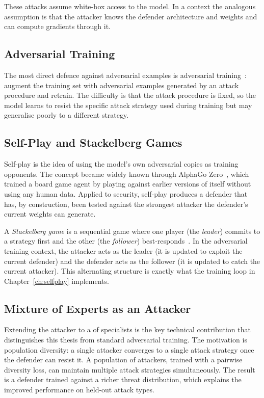 These attacks assume white-box access to the model. In a \wdn{}
context the analogous assumption is that the attacker knows the
defender architecture and weights and can compute gradients through
it.

\subsection{Adversarial Training}

The most direct defence against adversarial examples is adversarial
training~\cite{madry2018pgd}: augment the training set with adversarial
examples generated by an attack procedure and retrain. The difficulty
is that the attack procedure is fixed, so the model learns to resist
the specific attack strategy used during training but may generalise
poorly to a different strategy.

\subsection{Self-Play and Stackelberg Games}

Self-play is the idea of using the model's own adversarial copies as
training opponents. The concept became widely known through AlphaGo
Zero~\cite{silver2017alphagozero}, which trained a board game agent
by playing against earlier versions of itself without using any
human data. Applied to security, self-play produces a defender that
has, by construction, been tested against the strongest attacker the
defender's current weights can generate.

A \emph{Stackelberg game} is a sequential game where one player
(the \emph{leader}) commits to a strategy first and the other
(the \emph{follower}) best-responds~\cite{von2010leadership}. In
the adversarial training context, the attacker acts as the leader
(it is updated to exploit the current defender) and the defender
acts as the follower (it is updated to catch the current attacker).
This alternating structure is exactly what the training loop in
Chapter~\ref{ch:selfplay} implements.

\subsection{Mixture of Experts as an Attacker}

Extending the attacker to a \moe{} of specialists is the key
technical contribution that distinguishes this thesis from standard
adversarial training. The motivation is population diversity: a
single attacker converges to a single attack strategy once the
defender can resist it. A population of attackers, trained with a
pairwise diversity loss, can maintain multiple attack strategies
simultaneously. The result is a defender trained against a richer
threat distribution, which explains the improved performance on
held-out attack types.


